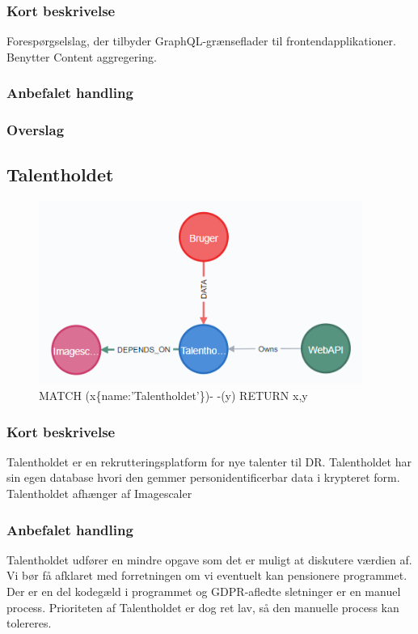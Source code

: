 \documentclass{article}
\begin{document}
\subsubsection{Kort beskrivelse}
Forespørgselslag, der tilbyder GraphQL-grænseflader til frontendapplikationer.
Benytter Content aggregering.
\subsubsection{Anbefalet handling}
\subsubsection{Overslag}


\subsection{Talentholdet}
\begin{figure}[h]
\includegraphics[width=300pt]{Talentholdet.PNG}
\caption{MATCH (x\{name:'Talentholdet'\})- -(y) RETURN x,y}
\end{figure}
\subsubsection{Kort beskrivelse}
Talentholdet er en rekrutteringsplatform for nye talenter til DR. Talentholdet har sin egen database hvori den gemmer personidentificerbar data i krypteret form. Talentholdet afhænger af Imagescaler
\subsubsection{Anbefalet handling}
Talentholdet udfører en mindre opgave som det er muligt at diskutere værdien af. Vi bør få afklaret med forretningen om vi eventuelt kan pensionere programmet. Der er en del kodegæld i programmet og GDPR-afledte sletninger er en manuel process.
Prioriteten af Talentholdet er dog ret lav, så den manuelle process kan tolereres.
\end{document}
